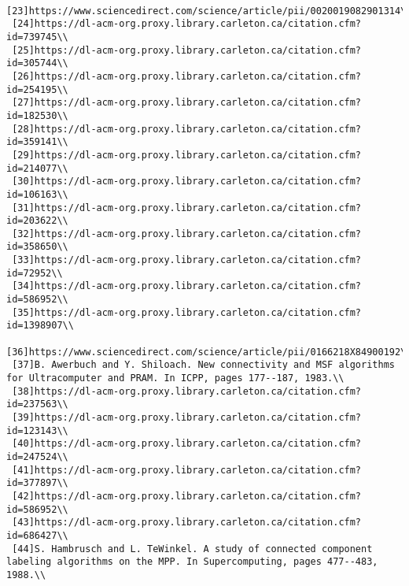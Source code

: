\documentclass[]{article}
\begin{document}
\begin{verbatim}
 [23]https://www.sciencedirect.com/science/article/pii/0020019082901314\\
 [24]https://dl-acm-org.proxy.library.carleton.ca/citation.cfm?id=739745\\
 [25]https://dl-acm-org.proxy.library.carleton.ca/citation.cfm?id=305744\\
 [26]https://dl-acm-org.proxy.library.carleton.ca/citation.cfm?id=254195\\
 [27]https://dl-acm-org.proxy.library.carleton.ca/citation.cfm?id=182530\\
 [28]https://dl-acm-org.proxy.library.carleton.ca/citation.cfm?id=359141\\
 [29]https://dl-acm-org.proxy.library.carleton.ca/citation.cfm?id=214077\\
 [30]https://dl-acm-org.proxy.library.carleton.ca/citation.cfm?id=106163\\
 [31]https://dl-acm-org.proxy.library.carleton.ca/citation.cfm?id=203622\\
 [32]https://dl-acm-org.proxy.library.carleton.ca/citation.cfm?id=358650\\
 [33]https://dl-acm-org.proxy.library.carleton.ca/citation.cfm?id=72952\\
 [34]https://dl-acm-org.proxy.library.carleton.ca/citation.cfm?id=586952\\
 [35]https://dl-acm-org.proxy.library.carleton.ca/citation.cfm?id=1398907\\
 [36]https://www.sciencedirect.com/science/article/pii/0166218X84900192\\
 [37]B. Awerbuch and Y. Shiloach. New connectivity and MSF algorithms for Ultracomputer and PRAM. In ICPP, pages 177--187, 1983.\\
 [38]https://dl-acm-org.proxy.library.carleton.ca/citation.cfm?id=237563\\
 [39]https://dl-acm-org.proxy.library.carleton.ca/citation.cfm?id=123143\\
 [40]https://dl-acm-org.proxy.library.carleton.ca/citation.cfm?id=247524\\
 [41]https://dl-acm-org.proxy.library.carleton.ca/citation.cfm?id=377897\\
 [42]https://dl-acm-org.proxy.library.carleton.ca/citation.cfm?id=586952\\
 [43]https://dl-acm-org.proxy.library.carleton.ca/citation.cfm?id=686427\\
 [44]S. Hambrusch and L. TeWinkel. A study of connected component labeling algorithms on the MPP. In Supercomputing, pages 477--483, 1988.\\

\end{verbatim}
\end{document}
